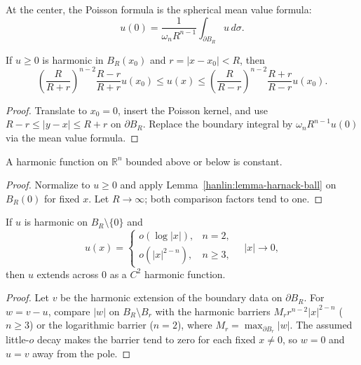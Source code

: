 \begin{remark}\label{hanlin:remark-poisson-mean-value}
At the center, the Poisson formula is the spherical mean value formula:
\[
u(0)=\frac1{\omega_nR^{n-1}}\int_{\partial B_R}u\,d\sigma.
\]
\end{remark}

\begin{lemma}\label{hanlin:lemma-harnack-ball}
If $u\ge0$ is harmonic in $B_R(x_0)$ and $r=|x-x_0|<R$, then
\[
\left(\frac R{R+r}\right)^{n-2}\frac{R-r}{R+r}u(x_0)
\le u(x)\le
\left(\frac R{R-r}\right)^{n-2}\frac{R+r}{R-r}u(x_0).
\]
\end{lemma}
\begin{proof}
\sketch Translate to $x_0=0$, insert the Poisson kernel, and use
$R-r\le|y-x|\le R+r$ on $\partial B_R$. Replace the boundary integral by
$\omega_nR^{n-1}u(0)$ via the mean value formula.
\end{proof}

\begin{corollary}\label{hanlin:corollary-liouville-poisson}
A harmonic function on $\mathbb R^n$ bounded above or below is constant.
\end{corollary}
\begin{proof}
\sketch Normalize to $u\ge0$ and apply Lemma~\ref{hanlin:lemma-harnack-ball} on
$B_R(0)$ for fixed $x$. Let $R\to\infty$; both comparison factors tend to one.
\end{proof}

\begin{theorem}\label{hanlin:thm-removable-singularity}
If $u$ is harmonic on $B_R\setminus\{0\}$ and
\[
u(x)=\begin{cases}o(\log|x|),&n=2,\\o(|x|^{2-n}),&n\ge3,\end{cases}
\quad |x|\to0,
\]
then $u$ extends across $0$ as a $C^2$ harmonic function.
\end{theorem}
\begin{proof}
\sketch Let $v$ be the harmonic extension of the boundary data on $\partial B_R$.
For $w=v-u$, compare $|w|$ on $B_R\setminus B_r$ with the harmonic barriers
$M_rr^{n-2}|x|^{2-n}$ ($n\ge3$) or the logarithmic barrier ($n=2$), where
$M_r=\max_{\partial B_r}|w|$. The assumed little-$o$ decay makes the barrier
tend to zero for each fixed $x\ne0$, so $w=0$ and $u=v$ away from the pole.
\end{proof}

